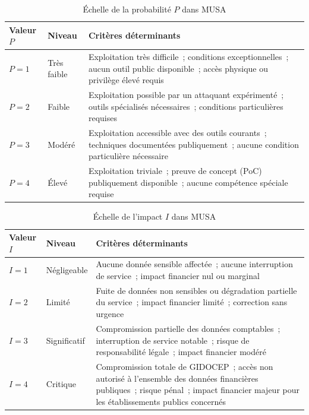 \documentclass[12pt,a4paper,oneside]{report}
\begin{document}
\begin{table}[H]
	\centering\small
	\caption{\'Echelle de la probabilit\'e $P$ dans MUSA}
	\label{tab:echelle_P}
	\begin{tabularx}{\textwidth}{p{1.5cm}p{4cm}X}
		\toprule
		\rowcolor{theadcolor}
		\color{white}\textbf{Valeur $P$} &
		\color{white}\textbf{Niveau} &
		\color{white}\textbf{Crit\`eres d\'eterminants} \\
		\midrule
		$P = 1$ & Tr\`es faible &
		Exploitation tr\`es difficile~; conditions exceptionnelles~; aucun outil
		public disponible~; acc\`es physique ou privil\`ege \'elev\'e requis \\
		$P = 2$ & Faible &
		Exploitation possible par un attaquant exp\'eriment\'e~; outils sp\'ecialis\'es
		n\'ecessaires~; conditions particuli\`eres requises \\
		$P = 3$ & Mod\'er\'e &
		Exploitation accessible avec des outils courants~; techniques document\'ees
		publiquement~; aucune condition particuli\`ere n\'ecessaire \\
		$P = 4$ & \'Elev\'e &
		Exploitation triviale~; preuve de concept (PoC) publiquement disponible~;
		aucune comp\'etence sp\'eciale requise \\
		\bottomrule
	\end{tabularx}
\end{table}

\begin{table}[H]
	\centering\small
	\caption{\'Echelle de l'impact $I$ dans MUSA}
	\label{tab:echelle_I}
	\begin{tabularx}{\textwidth}{p{1.5cm}p{4cm}X}
		\toprule
		\rowcolor{theadcolor}
		\color{white}\textbf{Valeur $I$} &
		\color{white}\textbf{Niveau} &
		\color{white}\textbf{Crit\`eres d\'eterminants} \\
		\midrule
		$I = 1$ & N\'egligeable &
		Aucune donn\'ee sensible affect\'ee~; aucune interruption de service~;
		impact financier nul ou marginal \\
		$I = 2$ & Limit\'e &
		Fuite de donn\'ees non sensibles ou d\'egradation partielle du service~;
		impact financier limit\'e~; correction sans urgence \\
		$I = 3$ & Significatif &
		Compromission partielle des donn\'ees comptables~; interruption de service
		notable~; risque de responsabilit\'e l\'egale~; impact financier mod\'er\'e \\
		$I = 4$ & Critique &
		Compromission totale de GIDOCEP~; acc\`es non autoris\'e \`a l'ensemble
		des donn\'ees financi\`eres publiques~; risque p\'enal~; impact financier
		majeur pour les \'etablissements publics concern\'es \\
		\bottomrule
	\end{tabularx}
\end{table}
\end{document}
